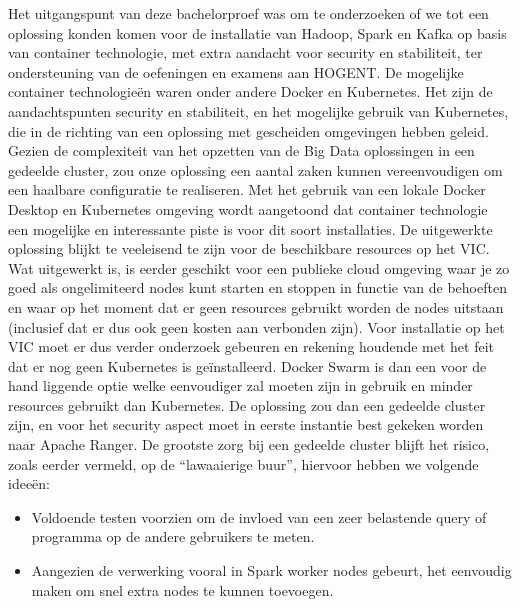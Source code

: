 Het uitgangspunt van deze bachelorproef was om te onderzoeken of we tot een oplossing konden komen voor de installatie van Hadoop, Spark en Kafka op basis van container technologie, met extra aandacht voor security en stabiliteit, ter ondersteuning van de oefeningen en examens aan HOGENT.
\newline
De mogelijke container technologieën waren onder andere Docker en Kubernetes.
\newline
\newline
Het zijn de aandachtspunten security en stabiliteit, en het mogelijke gebruik van Kubernetes, die in de richting van een oplossing met gescheiden omgevingen hebben geleid. 
\newline
\newline
Gezien de complexiteit van het opzetten van de Big Data oplossingen in een gedeelde cluster, zou onze oplossing een aantal zaken kunnen
vereenvoudigen om een haalbare configuratie te realiseren.
\newline
\newline
Met het gebruik van een lokale Docker Desktop en Kubernetes omgeving wordt aangetoond dat container technologie een mogelijke en interessante piste is voor dit soort installaties.
\newline
\newline
De uitgewerkte oplossing blijkt te veeleisend te zijn voor de beschikbare resources op het VIC. Wat uitgewerkt is, is eerder geschikt voor een publieke cloud omgeving waar je zo goed als ongelimiteerd nodes kunt starten en stoppen in functie van de behoeften en waar op het moment dat er geen resources gebruikt worden de nodes uitstaan (inclusief dat er dus ook geen kosten aan verbonden zijn).
\newline
\newline
Voor installatie op het VIC moet er dus verder onderzoek gebeuren en rekening houdende met het feit dat er nog geen Kubernetes is geïnstalleerd. Docker Swarm is dan een voor de hand liggende optie welke eenvoudiger zal moeten zijn in gebruik en minder resources gebruikt dan Kubernetes.
\newline
De oplossing zou dan een gedeelde cluster zijn, en voor het security aspect moet in eerste instantie best gekeken worden naar Apache Ranger.
\newline
De grootste zorg bij een gedeelde cluster blijft het risico, zoals eerder vermeld, op de ``lawaaierige buur'', hiervoor hebben we volgende ideeën:
\newline
\begin{itemize}
    \item Voldoende testen voorzien om de invloed van een zeer belastende query of programma op de andere gebruikers te meten.
    \item Aangezien de verwerking vooral in Spark worker nodes gebeurt, het eenvoudig maken om snel extra nodes te kunnen toevoegen.
\end{itemize}

